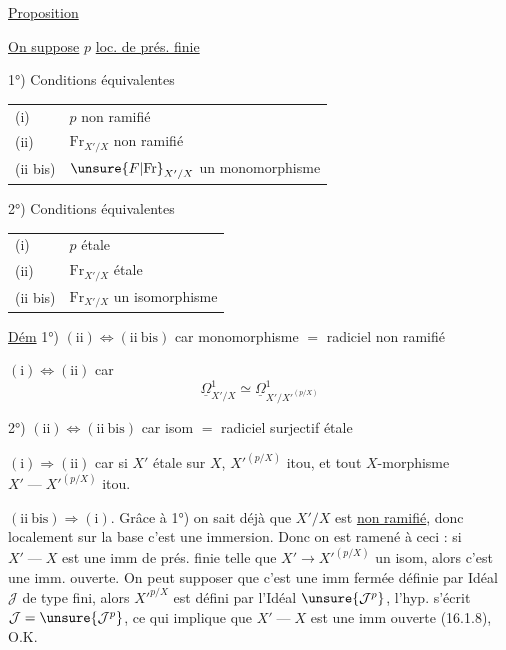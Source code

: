 
\uline{Proposition}

\uline{On suppose} $p$ \uline{loc. de prés. finie}

1°) Conditions équivalentes

\begin{tabular}{ll}
(i) & $p$ non ramifié\\
(ii) & $\mathrm{Fr}_{X'/X}$ non ramifié\\
(ii bis) & $\unsure{F|\mathrm{Fr}}_{X'/X}$ un monomorphisme
\end{tabular}

2°) Conditions équivalentes

\begin{tabular}{ll}
(i) & $p$ étale\\
(ii) & $\mathrm{Fr}_{X'/X}$ étale\\
(ii bis) & $\mathrm{Fr}_{X'/X}$ un isomorphisme
\end{tabular}

\uline{Dém} 1°) $(\mathrm{ii})\Longleftrightarrow(\mathrm{ii\ bis})$ car monomorphisme $=$ radiciel non ramifié

$(\mathrm{i})\Longleftrightarrow(\mathrm{ii})$ car
\[
\underline\Omega^1_{X'/X}\simeq\underline\Omega^1_{X'/X'^{(p/X)}}
\]

 2°) $(\mathrm{ii})\Longleftrightarrow(\mathrm{ii\ bis})$ car isom $=$ radiciel surjectif étale

$(\mathrm{i})\Longrightarrow(\mathrm{ii})$ car si $X'$ étale sur $X$, $X'^{(p/X)}$ itou, et
tout $X$-morphisme $X'\mathbin{\text{---}}X'^{(p/X)}$ itou.

$(\mathrm{ii\ bis})\Longrightarrow(\mathrm{i})$. Grâce à 1°) on sait déjà que $X'/X$
est \uline{non ramifié}, donc localement  sur la base
 c'est une immersion. Donc
on est ramené à ceci : si $X'\mathbin{\text{---}}X$ est
une imm de prés. finie telle que
$X'\longrightarrow X'^{(p/X)}$ un isom, alors c'est une imm.
ouverte. On peut supposer que c'est
une imm fermée définie par Idéal $\mathcal J$
de type fini, alors $X'^{p/X}$ est défini
par l'Idéal $\unsure{\mathcal J^p}$, l'hyp. s'écrit $\mathcal J=\unsure{\mathcal J^p}$,
ce qui implique que  $X'\mathbin{\text{---}}X$ est
une imm ouverte (16.1.8), O.K.
